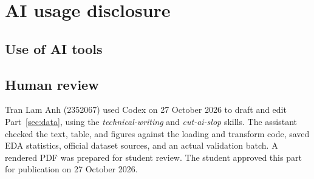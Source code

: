 \section{AI usage disclosure}
\label{app:ai}

\subsection{Use of AI tools}

\subsection{Human review}
Tran Lam Anh (2352067) used Codex on 27 October 2026 to draft and edit
Part~\ref{sec:data}, using the \emph{technical-writing} and \emph{cut-ai-slop}
skills. The assistant checked the text, table, and figures against the loading
and transform code, saved EDA statistics, official dataset sources, and an actual
validation batch. A rendered PDF was prepared for student review.
The student approved this part for publication on 27 October 2026.

